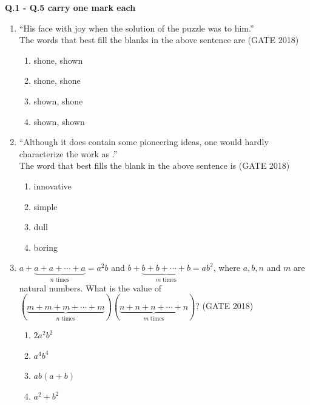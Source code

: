 \documentclass[journal,12pt,onecolumn]{IEEEtran}
\theoremstyle{remark}
\begin{document}
\textbf{\large Q.1 - Q.5 carry one mark each}
\vspace{1cm}
\begin{enumerate}
\item ``His face \underline{\hspace{1.5cm}} with joy when the solution of the puzzle was \underline{\hspace{1.5cm}} to him.''
\\The words that best fill the blanks in the above sentence are
\hfill{(GATE 2018)}
\begin{multicols}{4}
\begin{enumerate}
    \item shone, shown
    \item shone, shone
    \item shown, shone
    \item shown, shown
\end{enumerate}
\end{multicols}
\vspace{1cm}

\item ``Although it does contain some pioneering ideas, one would hardly characterize the work as \underline{\hspace{2cm}}.''
\\The word that best fills the blank in the above sentence is
\hfill{(GATE 2018)}
\begin{multicols}{4}
\begin{enumerate}
    \item innovative
    \item simple
    \item dull
    \item boring
\end{enumerate}
\end{multicols}
\vspace{1cm}

\item $a + \underbrace{a + a + \cdots + a}_{n \;\text{times}} = a^2b$ and $b + \underbrace{b + b + \cdots + b}_{m \;\text{times}} = ab^2$, where $a,b,n$ and $m$ are natural numbers. What is the value of\\
$\left(\underbrace{m + m + m + \cdots + m}_{n \;\text{times}}\right) \left(\underbrace{n + n + n + \cdots + n}_{m \;\text{times}}\right)$?
\hfill{(GATE 2018)}
\begin{multicols}{4}
\begin{enumerate}
    \item $2a^2b^2$
    \item $a^4b^4$
    \item $ab(a+b)$
    \item $a^2+b^2$
\end{enumerate}
\end{multicols}
\vspace{1cm}


\end{enumerate}
\end{document}
